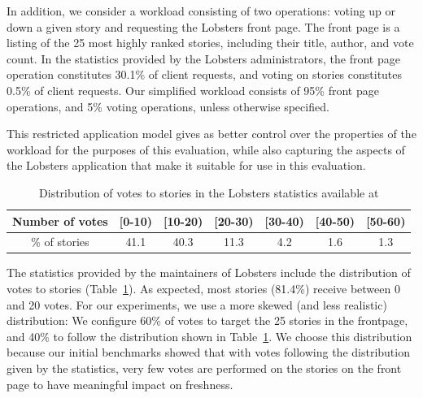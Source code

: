 In addition, we consider a workload consisting of two operations: voting up or down a given story and requesting the Lobsters
front page.
The front page is a listing of the 25 most highly ranked stories, including their title, author, and vote count.
In the statistics provided by the Lobsters administrators, the front page operation constitutes 30.1\% of client requests,
and voting on stories constitutes 0.5\% of client requests.
Our simplified workload consists of 95\% front page operations, and 5\% voting operations, unless otherwise specified.

This restricted application model gives as better control over the properties of the workload for the purposes of
this evaluation,
while also capturing the aspects of the Lobsters application that make it suitable for use in this evaluation.


\begin{table}[H]
\centering
\begin{tabular}{|c||c|c|c|c|c|c|}
\hline
Number of votes & [0-10) & [10-20) & [20-30) & [30-40) & [40-50) & [50-60) \\
\hline
\% of stories & 41.1 & 40.3 & 11.3 & 4.2 & 1.6 & 1.3 \\
\hline
\end{tabular}
\caption{Distribution of votes to stories in the Lobsters statistics available at \cite{lobste:stats}}
\label{tab:votes_per_story}
\end{table}

The statistics provided by the maintainers of Lobsters \cite{lobste:stats} include the distribution of votes to stories (Table~\ref{tab:votes_per_story}).
As expected, most stories (81.4\%) receive between 0 and 20 votes.
For our experiments, we use a more skewed (and less realistic) distribution:
We configure 60\% of votes to target the 25 stories in the frontpage, and 40\% to follow the distribution shown in Table~\ref{tab:votes_per_story}.
We choose this distribution because our initial benchmarks showed that with votes following the distribution given by the statistics,
very few votes are performed on the stories on the front page to have meaningful impact on freshness.

